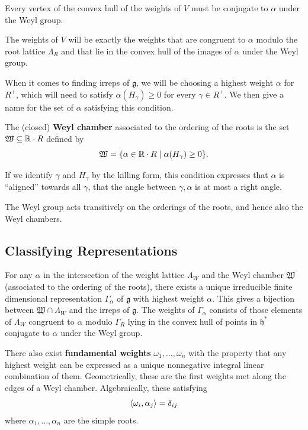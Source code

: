 \documentclass[12pt]{article}
\newcommand{\fg}{\mathfrak{g}}
\newcommand{\fh}{\mathfrak{h}}
\newcommand{\fW}{\mathfrak{W}}
\begin{document}
\begin{prop}
    Every vertex of the convex hull of the weights of $V$ must be conjugate to $\alpha$ under the Weyl group.
\end{prop}

\begin{prop}
    The weights of $V$ will be exactly the weights that are congruent to $\alpha$ modulo the root lattice $\Lambda_R$ and that lie in the convex hull of the images of $\alpha$ under the Weyl group.
\end{prop}

When it comes to finding irreps of $\fg$, we will be choosing a highest weight $\alpha$ for $R^+$, which will need to satisfy $\alpha(H_\gamma)\geq 0$ for every $\gamma\in R^+$. We then give a name for the set of $\alpha$ satisfying this condition.

\begin{defn}
    The (closed) \textbf{Weyl chamber} associated to the ordering of the roots is the set $\fW \subseteq \R\cdot R$ defined by
    \[\fW = \{\alpha\in \R\cdot R \mid \alpha(H_\gamma)\geq 0\}.\]
\end{defn}

If we identify $\gamma$ and $H_\gamma$ by the killing form, this condition expresses that $\alpha$ is ``aligned'' towards all $\gamma$, that the angle between $\gamma,\alpha$ is at most a right angle.

The Weyl group acts transitively on the orderings of the roots, and hence also the Weyl chambers.

\subsection{Classifying Representations}

\begin{thm}
    For any $\alpha$ in the intersection of the weight lattice $\Lambda_W$ and the Weyl chamber $\fW$ (associated to the ordering of the roots), there exists a unique irreducible finite dimensional representation $\Gamma_\alpha$ of $\fg$ with highest weight $\alpha$. This gives a bijection between $\fW\cap \Lambda_W$ and the irreps of $\fg$. The weights of $\Gamma_\alpha$ consists of those elements of $\Lambda_W$ congruent to $\alpha$ modulo $\Gamma_R$ lying in the convex hull of points in $\fh^*$ conjugate to $\alpha$ under the Weyl group.
\end{thm}

There also exist \textbf{fundamental weights} $\omega_1,\dots,\omega_n$ with the property that any highest weight can be expressed as a unique nonnegative integral linear combination of them. Geometrically, these are the first weights met along the edges of a Weyl chamber. Algebraically, these satisfying
\[\left\langle\omega_i,\alpha_j\right\rangle = \delta_{ij}\]
where $\alpha_1,\dots,\alpha_n$ are the simple roots.
\end{document}
